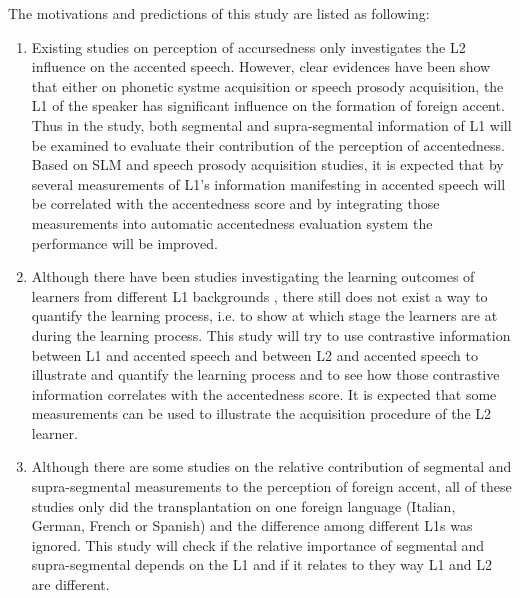 The motivations and predictions of this study are listed as following:
\begin{enumerate}
\item Existing studies on perception of accursedness only investigates the L2 influence on the accented speech. However, clear evidences have been show that either on phonetic systme acquisition or speech prosody acquisition, the L1 of the speaker has significant influence on the formation of foreign accent. Thus in the study, both segmental and supra-segmental information of L1 will be examined to evaluate their contribution of the perception of accentedness. Based on SLM and speech prosody acquisition studies, it is expected that by several measurements of L1's information manifesting in accented speech will be correlated with the accentedness score and by integrating those measurements into automatic accentedness evaluation system the performance will be improved.
\item Although there have been studies investigating the learning outcomes of learners from different L1 backgrounds \citep{li2014l2,white2007calibrating}, there still does not exist a way to quantify the learning process, i.e. to show at which stage the learners are at during the learning process. This study will try to use contrastive information between L1 and accented speech and between L2 and accented speech to illustrate and quantify the learning process and to see how those contrastive information correlates with the accentedness score. It is expected that some measurements can be used to illustrate the acquisition procedure of the L2 learner.
\item Although there are some studies on the relative contribution of segmental and supra-segmental measurements to the perception of foreign accent, all of these studies only did the transplantation on one foreign language (Italian, German, French or Spanish) and the difference among different L1s was ignored. This study will check if the relative importance of segmental and supra-segmental depends on the L1 and if it relates to they way L1 and L2 are different.
\end{enumerate}

